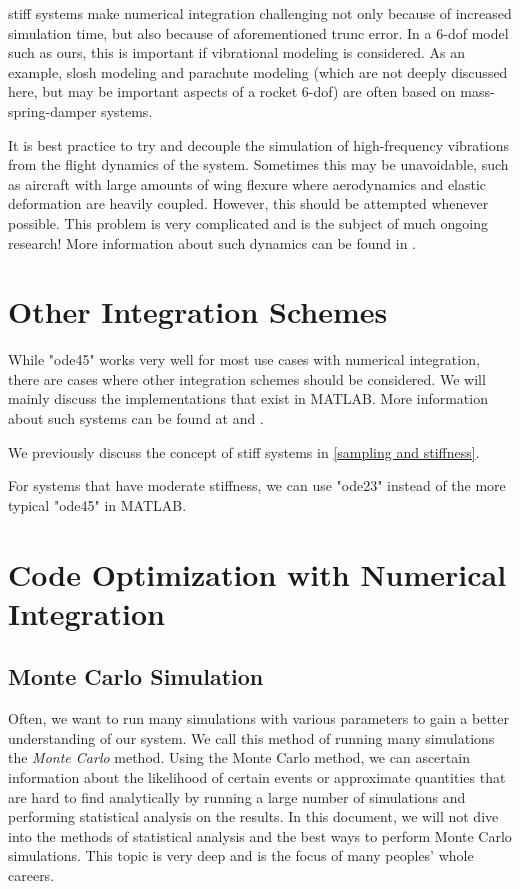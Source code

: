 \documentclass[12pt]{report}
\begin{document}
\Gls{stiff} systems make numerical integration challenging not only because of increased simulation time, but also because of aforementioned \gls{trunc error}. In a 6-\gls{dof} model such as ours, this is important if vibrational modeling is considered. As an example, slosh modeling and parachute modeling (which are not deeply discussed here, but may be important aspects of a rocket 6-\gls{dof}) are often based on mass-spring-damper systems.

It is best practice to try and decouple the simulation of high-frequency vibrations from the flight dynamics of the system. Sometimes this may be unavoidable, such as aircraft with large amounts of wing flexure where aerodynamics and elastic deformation are heavily coupled. However, this should be attempted whenever possible. This problem is very complicated and is the subject of much ongoing research! More information about such dynamics can be found in \cite{shyy_recent_2010}.
\section{Other Integration Schemes}
While "ode45" works very well for most use cases with numerical integration, there are cases where other integration schemes should be considered. We will mainly discuss the implementations that exist in MATLAB. More information about such systems can be found at \cite{mathworks_choose_2024} and \cite{mathworks_summary_2024}.

We previously discuss the concept of \gls{stiff} systems in \ref{sampling and stiffness}. 

For systems that have moderate stiffness, we can use "ode23" instead of the more typical "ode45" in MATLAB.

\section{Code Optimization with Numerical Integration}
\subsection{Monte Carlo Simulation}
Often, we want to run many simulations with various parameters to gain a better understanding of our system. We call this method of running many simulations the \textit{Monte Carlo} method. Using the Monte Carlo method, we can ascertain information about the likelihood of certain events or approximate quantities that are hard to find analytically by running a large number of simulations and performing statistical analysis on the results. In this document, we will not dive into the methods of statistical analysis and the best ways to perform Monte Carlo simulations. This topic is very deep and is the focus of many peoples’ whole careers.
\end{document}
